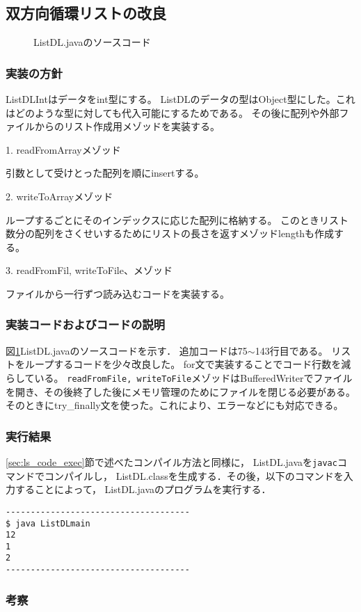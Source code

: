 \documentclass[10.5pt,a4paper]{jsarticle}
\newcommand{\figref}[1]{図\ref{#1}}
\newcommand{\secref}[1]{\ref{#1}節}
\begin{document}
\subsection{双方向循環リストの改良}

\begin{figure}[t]
  \begin{center}
   
   \caption{ListDL.javaのソースコード}
   \label{code:ListDL}
  \end{center}
 \end{figure}

\subsubsection{実装の方針}\label{sec:bs_impl_policy}
ListDLIntはデータをint型にする。
ListDLのデータの型はObject型にした。これはどのような型に対しても代入可能にするためである。
その後に配列や外部ファイルからのリスト作成用メゾッドを実装する。

1. readFromArrayメゾッド

引数として受けとった配列を順にinsertする。

2. writeToArrayメゾッド

ループするごとにそのインデックスに応じた配列に格納する。
このときリスト数分の配列をさくせいするためにリストの長さを返すメゾッドlengthも作成する。

3. readFromFil, writeToFile、メゾッド

ファイルから一行ずつ読み込むコードを実装する。

\subsubsection{実装コードおよびコードの説明}

\figref{code:ListDL}ListDL.javaのソースコードを示す．
追加コードは75$\sim$143行目である。
リストをループするコードを少々改良した。
for文で実装することでコード行数を減らしている。
\texttt{readFromFile, writeToFile}メゾッドはBufferedWriterでファイルを開き、その後終了した後にメモリ管理のためにファイルを閉じる必要がある。
そのときにtry\_finally文を使った。これにより、エラーなどにも対応できる。

\subsubsection{実行結果}

\secref{sec:ls_code_exec}で述べたコンパイル方法と同様に，
ListDL.javaを\texttt{javac}コマンドでコンパイルし，
ListDL.classを生成する．その後，以下のコマンドを入力することによって，
ListDL.javaのプログラムを実行する．

\begin{verbatim}
-------------------------------------
$ java ListDLmain
12
1
2
-------------------------------------
\end{verbatim}
\subsubsection{考察}
\end{document}
